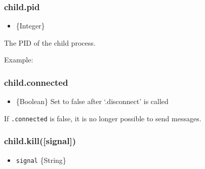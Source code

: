 \subsubsection{child.pid}\label{child.pid}

\begin{itemize}
\itemsep1pt\parskip0pt
\item
  \{Integer\}
\end{itemize}

The PID of the child process.

Example:

\begin{Shaded}
\begin{Highlighting}[]
 \NormalTok{(}\NormalTok{,}
    \NormalTok{(}\NormalTok{, [}\NormalTok{]);}

\NormalTok{(} \NormalTok{+ }\NormalTok{);}
\NormalTok{();}
\end{Highlighting}
\end{Shaded}

\subsubsection{child.connected}\label{child.connected}

\begin{itemize}
\itemsep1pt\parskip0pt
\item
  \{Boolean\} Set to false after `.disconnect' is called
\end{itemize}

If \texttt{.connected} is false, it is no longer possible to send
messages.

\subsubsection{child.kill({[}signal{]})}\label{child.killsignal}

\begin{itemize}
\itemsep1pt\parskip0pt
\item
  \texttt{signal} \{String\}
\end{itemize}

